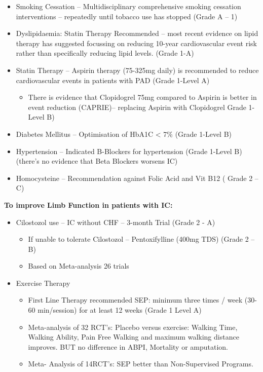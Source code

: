 \documentclass[
]{book}
\providecommand{\tightlist}{%
  \setlength{\itemsep}{0pt}\setlength{\parskip}{0pt}}
\begin{document}
\begin{itemize}
\item
  Smoking Cessation -- Multidisciplinary comprehensive smoking
  cessation interventions -- repeatedly until tobacco use has stopped
  (Grade A -- 1)
\item
  Dyslipidaemia: Statin Therapy Recommended -- most recent evidence on
  lipid therapy has suggested focussing on reducing 10-year
  cardiovascular event risk rather than specifically reducing lipid
  levels. (Grade 1-A)
\item
  Statin Therapy -- Aspirin therapy (75-325mg daily) is recommended to
  reduce cardiovascular events in patients with PAD (Grade 1-Level A)
  \citep{collaborationCollaborativeMetaanalysisRandomised2002}

  \begin{itemize}
  \tightlist
  \item
    There is evidence that Clopidogrel 75mg compared to Aspirin is
    better in event reduction
    (CAPRIE)\citep{capriesteeringcommitteeRandomisedBlindedTrial1996}--
    replacing Aspirin with Clopidogrel Grade 1-Level B)
  \end{itemize}
\item
  Diabetes Mellitus -- Optimisation of HbA1C \textless{} 7\% (Grade 1-Level B)
\item
  Hypertension -- Indicated B-Blockers for hypertension (Grade
  1-Level B) (there's no evidence that Beta Blockers worsens IC)
\item
  Homocysteine -- Recommendation against Folic Acid and Vit B12 (
  Grade 2 -- C)
\end{itemize}

\textbf{To improve Limb Function in patients with IC:}

\begin{itemize}
\item
  Cilostozol use -- IC without CHF -- 3-month Trial (Grade 2 - A)

  \begin{itemize}
  \item
    If unable to tolerate Cilostozol -- Pentoxifylline (400mg TDS)
    (Grade 2 -- B)
  \item
    Based on Meta-analysis 26 trials
    \citep{stevensSystematicReviewEfficacy2012}
  \end{itemize}
\item
  Exercise Therapy

  \begin{itemize}
  \item
    First Line Therapy recommended SEP: minimum three times / week
    (30-60 min/session) for at least 12 weeks (Grade 1 Level A)
  \item
    Meta-analysis of 32 RCT's: Placebo versus exercise: Walking
    Time, Walking Ability, Pain Free Walking and maximum walking
    distance improves. BUT no difference in ABPI, Mortality or
    amputation. \citep{laneExerciseIntermittentClaudication2017}
  \item
    Meta- Analysis of 14RCT's: SEP better than Non-Supervised
    Programs. \citep{hagemanSupervisedExerciseTherapy2018}
  \end{itemize}
\end{itemize}
\end{document}

